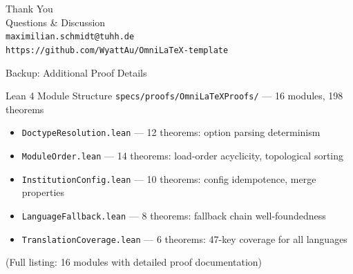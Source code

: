 \documentclass[
  doctype=beamer,
  beameraspectratio=169,
  beamertheme=Copenhagen,
  language=english,
]{omnilatex}
\begin{document}
\begin{frame}[plain,c]
  \vspace{1.5cm}
  {\huge Thank You}\\[0.8cm]
  {\large Questions \& Discussion}\\[1.5cm]
  {\footnotesize
  \texttt{maximilian.schmidt@tuhh.de}\\[0.3em]
  \texttt{https://github.com/WyattAu/OmniLaTeX-template}
  }
\end{frame}


\appendix
\begin{frame}[allowframebreaks]{Backup: Additional Proof Details}
  \begin{block}{Lean 4 Module Structure}
    \texttt{specs/proofs/OmniLaTeXProofs/} --- 16 modules, 198 theorems
    \begin{itemize}
      \item \texttt{DoctypeResolution.lean} --- 12 theorems: option parsing determinism
      \item \texttt{ModuleOrder.lean} --- 14 theorems: load-order acyclicity, topological sorting
      \item \texttt{InstitutionConfig.lean} --- 10 theorems: config idempotence, merge properties
      \item \texttt{LanguageFallback.lean} --- 8 theorems: fallback chain well-foundedness
      \item \texttt{TranslationCoverage.lean} --- 6 theorems: 47-key coverage for all languages
    \end{itemize}
    (Full listing: 16 modules with detailed proof documentation)
  \end{block}
\end{frame}
\end{document}
